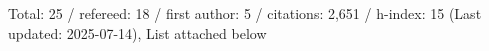 Total: 25 / refereed: 18 / first author: 5 / citations: 2,651 / h-index: 15 (Last updated: 2025-07-14), List attached below